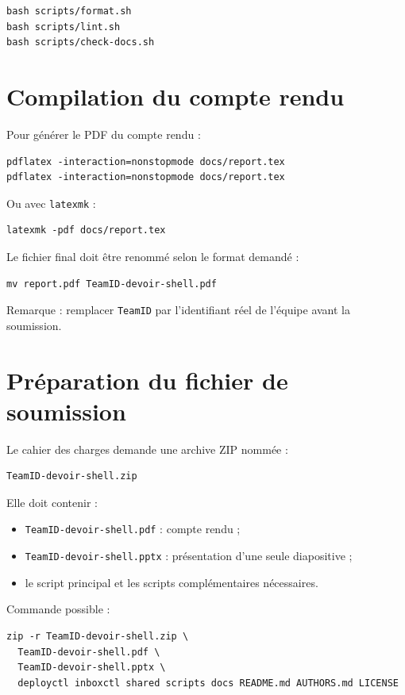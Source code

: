 \documentclass[12pt,a4paper]{article}
\begin{document}
\begin{lstlisting}
bash scripts/format.sh
bash scripts/lint.sh
bash scripts/check-docs.sh
\end{lstlisting}

\section{Compilation du compte rendu}

Pour générer le PDF du compte rendu :

\begin{lstlisting}
pdflatex -interaction=nonstopmode docs/report.tex
pdflatex -interaction=nonstopmode docs/report.tex
\end{lstlisting}

Ou avec \texttt{latexmk} :

\begin{lstlisting}
latexmk -pdf docs/report.tex
\end{lstlisting}

Le fichier final doit être renommé selon le format demandé :

\begin{lstlisting}
mv report.pdf TeamID-devoir-shell.pdf
\end{lstlisting}

Remarque : remplacer \texttt{TeamID} par l'identifiant réel de l'équipe avant la soumission.

\section{Préparation du fichier de soumission}

Le cahier des charges demande une archive ZIP nommée :

\begin{lstlisting}
TeamID-devoir-shell.zip
\end{lstlisting}

Elle doit contenir :
\begin{itemize}[leftmargin=*]
  \item \texttt{TeamID-devoir-shell.pdf} : compte rendu ;
  \item \texttt{TeamID-devoir-shell.pptx} : présentation d'une seule diapositive ;
  \item le script principal et les scripts complémentaires nécessaires.
\end{itemize}

Commande possible :

\begin{lstlisting}
zip -r TeamID-devoir-shell.zip \
  TeamID-devoir-shell.pdf \
  TeamID-devoir-shell.pptx \
  deployctl inboxctl shared scripts docs README.md AUTHORS.md LICENSE
\end{lstlisting}
\end{document}
